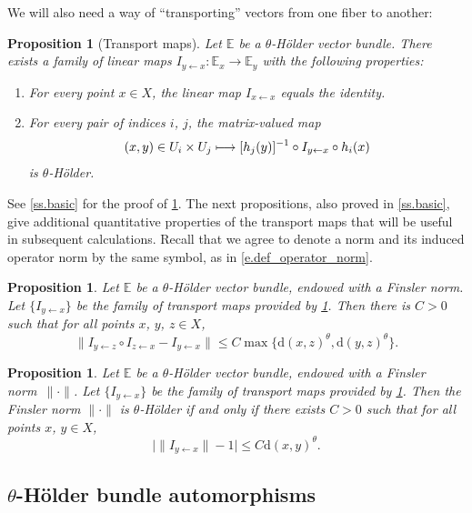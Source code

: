 \documentclass[10pt]{amsart}
\newcommand\mto{\mathchoice{\longmapsto}{\mapsto}{\mapsto}{\mapsto}}
\theoremstyle{plain}
\newtheorem{proposition}[theorem]{Proposition}
\theoremstyle{definition}
\newcommand{\EE}{\mathbb{E}}
\newcommand{\dd}{\mathrm{d}}
\begin{document}
We will also need a way of ``transporting'' vectors from one fiber to another:

\begin{proposition}[Transport maps]\label{p.transport}
Let $\EE$ be a $\theta$-Hölder vector bundle.
There exists a family of linear maps $I_{y \gets x} \colon \EE_x \to \EE_y$ with the following properties:
\begin{enumerate}
\item
For every point $x \in X$, the linear map $I_{x \gets x}$ equals the identity.
\item
For every pair of indices $i$, $j$, the matrix-valued map
\[
(x,y) \in U_i \times U_j \mto [h_j(y)]^{-1} \circ I_{y \gets x} \circ h_i(x)
\]
is $\theta$-Hölder.
\end{enumerate}
\end{proposition}

See \cref{ss.basic} for the proof of \cref{p.transport}. The next propositions, also proved in \cref{ss.basic}, give additional quantitative properties of the transport maps that will be useful in subsequent calculations.
Recall that we agree to denote a norm and its induced operator norm by the same symbol, as in \eqref{e.def_operator_norm}.

\begin{proposition}\label{p.transport_groupoid}
Let $\EE$ be a $\theta$-Hölder vector bundle, endowed with a Finsler norm.
Let $\{I_{y\gets x}\}$ be the family of transport maps provided by \cref{p.transport}.
Then there is $C>0$ such that for all points $x$, $y$, $z \in X$,
\[
\| I_{y \gets z} \circ I_{z \gets x} - I_{y \gets x} \| \le C \max\{ \dd(x,z)^\theta, \dd(y,z)^\theta \}.
\]
\end{proposition}

\begin{proposition}\label{p.norm_Holder}
Let $\EE$ be a $\theta$-Hölder vector bundle, endowed with a Finsler norm~$\| \mathord{\cdot}\|$.
Let $\{I_{y\gets x}\}$ be the family of transport maps provided by \cref{p.transport}.
Then the Finsler norm $\|\mathord{\cdot}\|$ is $\theta$-Hölder if and only if
there exists $C>0$ such that for all points $x$, $y \in X$,
\[
\big| \|I_{y \gets x}\| - 1 \big| \le C \dd(x,y) ^\theta.
\]
\end{proposition}

\subsection{\texorpdfstring{$\theta$}{theta}-Hölder bundle automorphisms}\label{ss.auto}
\end{document}
